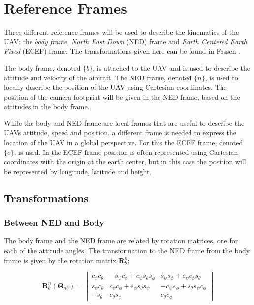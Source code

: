 \section{Reference Frames}

Three different reference frames will be used to describe the kinematics of the UAV: the \textit{body frame}, \textit{North East Down} (NED) frame and \textit{Earth Centered Earth Fixed} (ECEF) frame. The transformations given here can be found in Fossen \cite{FOSSEN}.

The body frame, denoted $\{b\}$, is attached to the UAV and is used to describe the attitude and velocity of the aircraft. The NED frame, denoted $\{n\}$, is used to locally describe the position of the UAV using Cartesian coordinates. The position of the camera footprint will be given in the NED frame, based on the attitudes in the body frame.

While the body and NED frame are local frames that are useful to describe the UAVs attitude, speed and position, a different frame is needed to express the location of the UAV in a global perspective. For this the ECEF frame, denoted $\{e\}$, is used. In the ECEF frame position is often represented using Cartesian coordinates with the origin at the earth center, but in this case the position will be represented by longitude, latitude and height.


\subsection{Transformations}


\subsubsection{Between NED and Body}

The body frame and the NED frame are related by rotation matrices, one for each of the attitude angles. The transformation to the NED frame from the body frame is given by the rotation matrix $\mathbf{R}_b^n$:

\begin{equation}
	\mathbf{R}_b^n(\bm{\Theta}_{nb}) =
	\begin{bmatrix}
		c_\psi c_\theta & -s_\psi c_\phi+c_\psi s_\theta s_\phi & s_\psi s_\phi+c_\psi c_\phi s_\theta \\
		s_\psi c_\theta & c_\psi c_\phi+s_\phi s_\theta s_\psi & -c_\psi s_\phi+s_\theta s_\psi c_\phi \\
		-s_\theta & c_\theta s_\phi & c_\theta c_\phi
	\end{bmatrix}
\end{equation}

